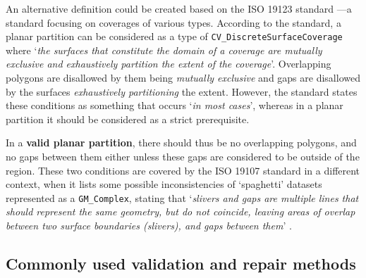 An alternative definition could be created based on the ISO 19123 standard \citep[\S{}6.8]{ISO19123:2007}---a standard focusing on coverages of various types.
According to the standard, a planar partition can be considered as a type of \texttt{CV\_DiscreteSurfaceCoverage} where `\emph{the surfaces that constitute the domain of a coverage are mutually exclusive and exhaustively partition the extent of the coverage}'.
Overlapping polygons are disallowed by them being \emph{mutually exclusive} and gaps are disallowed by the surfaces \emph{exhaustively partitioning} the extent.
However, the standard states these conditions as something that occurs `\emph{in most cases}', whereas in a planar partition it should be considered as a strict prerequisite.

In a \textbf{valid planar partition}, there should thus be no overlapping polygons, and no gaps between them either unless these gaps are considered to be outside of the region.
These two conditions are covered by the ISO 19107 standard in a different context, when it lists some possible inconsistencies of `spaghetti' datasets represented as a \texttt{GM\_Complex}, stating that `\emph{slivers and gaps are multiple lines that should represent the same geometry, but do not coincide, leaving areas of overlap between two surface boundaries (slivers), and gaps between them}' \citep[\S{}6.2.2.6]{ISO19107:2005}.

\subsection{Commonly used validation and repair methods}

